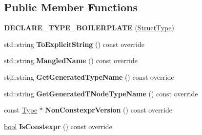 \subsection*{Public Member Functions}
\begin{DoxyCompactItemize}
\item 
\mbox{\label{classv8_1_1internal_1_1torque_1_1StructType_aad8e213fe09daa2081faceeb90f1ec99}} 
{\bfseries D\+E\+C\+L\+A\+R\+E\+\_\+\+T\+Y\+P\+E\+\_\+\+B\+O\+I\+L\+E\+R\+P\+L\+A\+TE} (\mbox{\hyperlink{classv8_1_1internal_1_1torque_1_1StructType}{Struct\+Type}})
\item 
\mbox{\label{classv8_1_1internal_1_1torque_1_1StructType_ad8276ee2ffe5e6c032b15a24926eafa8}} 
std\+::string {\bfseries To\+Explicit\+String} () const override
\item 
\mbox{\label{classv8_1_1internal_1_1torque_1_1StructType_a3a73541fc00508d0de3afe62beef618f}} 
std\+::string {\bfseries Mangled\+Name} () const override
\item 
\mbox{\label{classv8_1_1internal_1_1torque_1_1StructType_adbb49ef90402dd187c2823d896d3ac69}} 
std\+::string {\bfseries Get\+Generated\+Type\+Name} () const override
\item 
\mbox{\label{classv8_1_1internal_1_1torque_1_1StructType_a3b74ae20b47d5c1f8d1125138a8c1d40}} 
std\+::string {\bfseries Get\+Generated\+T\+Node\+Type\+Name} () const override
\item 
\mbox{\label{classv8_1_1internal_1_1torque_1_1StructType_a6e7d0de0730cccc9bdc192dfe2972984}} 
const \mbox{\hyperlink{classv8_1_1internal_1_1torque_1_1Type}{Type}} $\ast$ {\bfseries Non\+Constexpr\+Version} () const override
\item 
\mbox{\label{classv8_1_1internal_1_1torque_1_1StructType_a7b62370b421e05e6a498039dccf1d032}} 
\mbox{\hyperlink{classbool}{bool}} {\bfseries Is\+Constexpr} () const override
\item 
\mbox{\label{classv8_1_1internal_1_1torque_1_1StructType_accce3001d849554d585d972c02844e1c}} 

\end{DoxyCompactItemize}
